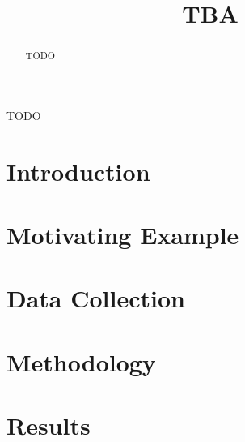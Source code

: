 \documentclass[conference]{IEEEtran}
\begin{document}
	\title {TBA}

    \author{
    }

    \maketitle
    \thispagestyle{plain}
    \pagestyle{plain}

    \begin{abstract}
      TODO
    \end{abstract}
    
    

    \begin{IEEEkeywords}
        TODO
    \end{IEEEkeywords}


    \section{Introduction} \label{sec:introduction}
    

    \section{Motivating Example} \label{sec:motivating}
    



    \section{Data Collection}\label{sec:data-collection}
    


    \section{Methodology}\label{sec:methodology}
    


    \section{Results}\label{sec:results}
    
\end{document}
